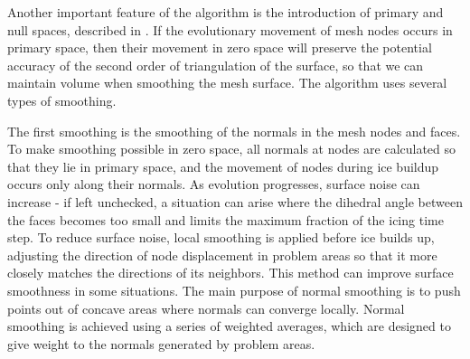 Another important feature of the algorithm is the introduction of primary and null spaces, described in \cite{Jiao_null_space_smooth}.
If the evolutionary movement of mesh nodes occurs in primary space, then their movement in zero space will preserve the potential accuracy of the second order of triangulation of the surface, so that we can maintain volume when smoothing the mesh surface.
The algorithm uses several types of smoothing.

The first smoothing is the smoothing of the normals in the mesh nodes and faces.
To make smoothing possible in zero space, all normals at nodes are calculated so that they lie in primary space, and the movement of nodes during ice buildup occurs only along their normals.
As evolution progresses, surface noise can increase - if left unchecked, a situation can arise where the dihedral angle between the faces becomes too small and limits the maximum fraction of the icing time step.
To reduce surface noise, local smoothing is applied before ice builds up, adjusting the direction of node displacement in problem areas so that it more closely matches the directions of its neighbors.
This method can improve surface smoothness in some situations.
The main purpose of normal smoothing is to push points out of concave areas where normals can converge locally.
Normal smoothing is achieved using a series of weighted averages, which are designed to give weight to the normals generated by problem areas.

